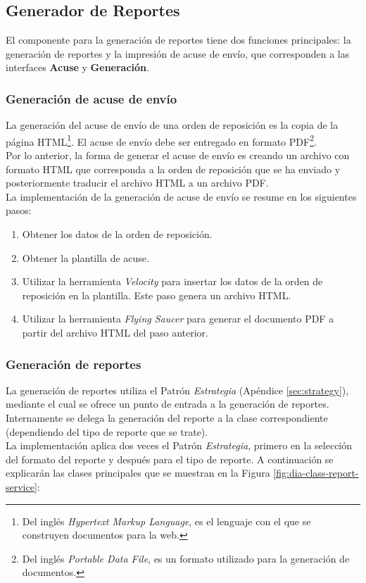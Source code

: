 \subsection{Generador de Reportes}
El componente para la generación de reportes tiene dos funciones principales: la generación de reportes y la impresión de acuse de envío, que corresponden a las interfaces \textbf{Acuse} y \textbf{Generación}.

\subsubsection{Generación de acuse de envío}\label{sec:gen-acuse}
La generación del acuse de envío de una orden de reposición es la copia de la página HTML\footnote{Del inglés \textit{Hypertext Markup Language}, es el lenguaje con el que se construyen documentos para la web\cite{HTMLCSSCompleteReference}.}. El acuse de envío debe ser entregado en formato PDF\footnote{Del inglés \textit{Portable Data File}, es un formato utilizado para la generación de documentos\cite{iTextInAction}.}.\\
Por lo anterior, la forma de generar el acuse de envío es creando un archivo con formato HTML que corresponda a la orden de reposición que se ha enviado y posteriormente traducir el archivo HTML a un archivo PDF.\\
La implementación de la generación de acuse de envío se resume en los siguientes pasos:
\begin{enumerate}
	\item Obtener los datos de la orden de reposición.
	\item Obtener la plantilla de acuse.
	\item Utilizar la herramienta \textit{Velocity} para insertar los datos de la orden de reposición en la plantilla. Este paso genera un archivo HTML.
	\item Utilizar la herramienta \textit{Flying Saucer} para generar el documento PDF a partir del archivo HTML del paso anterior.
\end{enumerate}

\subsubsection{Generación de reportes}\label{sec:gen-repport}
La generación de reportes utiliza el Patrón \textit{Estrategia} (Apéndice \ref{sec:strategy}), mediante el cual se ofrece un punto de entrada a la generación de reportes. Internamente se delega la generación del reporte a la clase correspondiente (dependiendo del tipo de reporte que se trate).\\
La implementación aplica dos veces el Patrón \textit{Estrategia}, primero en la selección del formato del reporte y después para el tipo de reporte. A continuación se explicarán las clases principales que se muestran en la Figura \ref{fig:dia-class-report-service}:

